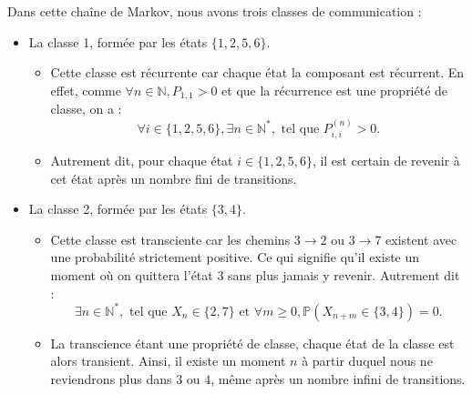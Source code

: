 \documentclass{article}
\begin{document}
\begin{tcolorbox}[colback=white,colframe=yellow!80!black,title=Exemple, breakable]
\begin{center}
\end{center}

Dans cette chaîne de Markov, nous avons trois classes de communication :
\begin{itemize}
    \item La classe 1, formée par les états $\{1, 2, 5, 6\}$.
        \begin{itemize}
            \item Cette classe est récurrente car chaque état la composant est récurrent. En effet, comme $\forall n \in \mathbb{N}, P_{1,1} > 0$ et que la récurrence est une propriété de classe, on a :
                \[
                \forall i \in \{1, 2, 5, 6\}, \exists n \in \mathbb{N}^{*}, \text{ tel que } P_{i,i}^{(n)} > 0.
                \]
            \item Autrement dit, pour chaque état $i \in \{1, 2, 5, 6\}$, il est certain de revenir à cet état après un nombre fini de transitions.
        \end{itemize}
    \item La classe 2, formée par les états $\{3, 4\}$.
        \begin{itemize}
            \item Cette classe est transciente car les chemins $3 \to 2$ ou $3 \to 7$ existent avec une probabilité strictement positive. Ce qui signifie qu'il existe un moment où on quittera l'état $3$ sans plus jamais y revenir. Autrement dit :
                \[
                \exists n \in \mathbb{N}^{*}, \text{ tel que } X_n \in \{2, 7\} \text{ et } \forall m \geq 0, \mathbb{P}(X_{n+m} \in \{3, 4\}) = 0.
                \]
            \item La transcience étant une propriété de classe, chaque état de la classe est alors transient. Ainsi, il existe un moment $n$ à partir duquel nous ne reviendrons plus dans $3$ ou $4$, même après un nombre infini de transitions.

\end{itemize}
\end{itemize}
\end{tcolorbox}
\end{document}

